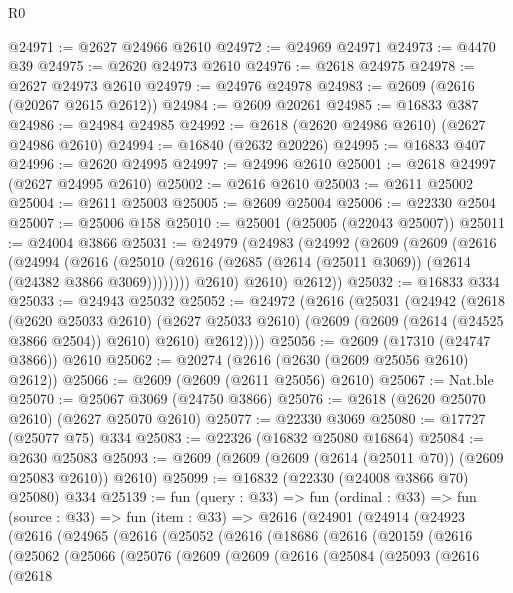 \begin{lexlean}{R0}
\begin{coremodule}
@24971 := @2627 @24966 @2610
@24972 := @24969 @24971
@24973 := @4470 @39
@24975 := @2620 @24973 @2610
@24976 := @2618 @24975
@24978 := @2627 @24973 @2610
@24979 := @24976 @24978
@24983 := @2609 (@2616 (@20267 @2615 @2612))
@24984 := @2609 @20261
@24985 := @16833 @387
@24986 := @24984 @24985
@24992 := @2618 (@2620 @24986 @2610) (@2627 @24986 @2610)
@24994 := @16840 (@2632 @20226)
@24995 := @16833 @407
@24996 := @2620 @24995
@24997 := @24996 @2610
@25001 := @2618 @24997 (@2627 @24995 @2610)
@25002 := @2616 @2610
@25003 := @2611 @25002
@25004 := @2611 @25003
@25005 := @2609 @25004
@25006 := @22330 @2504
@25007 := @25006 @158
@25010 := @25001 (@25005 (@22043 @25007))
@25011 := @24004 @3866
@25031 := @24979
    (@24983
      (@24992
        (@2609
          (@2609
            (@2616
              (@24994
                (@2616
                  (@25010 (@2616 (@2685 (@2614 (@25011 @3069)) (@2614 (@24382 @3866 @3069))))))))
            @2610)
          @2610)
        @2612))
@25032 := @16833 @334
@25033 := @24943 @25032
@25052 := @24972
    (@2616
      (@25031
        (@24942
          (@2618
            (@2620 @25033 @2610)
            (@2627 @25033 @2610)
            (@2609 (@2609 (@2614 (@24525 @3866 @2504)) @2610) @2610)
            @2612))))
@25056 := @2609 (@17310 (@24747 @3866)) @2610
@25062 := @20274 (@2616 (@2630 (@2609 @25056 @2610) @2612))
@25066 := @2609 (@2609 (@2611 @25056) @2610)
@25067 := Nat.ble
@25070 := @25067 @3069 (@24750 @3866)
@25076 := @2618 (@2620 @25070 @2610) (@2627 @25070 @2610)
@25077 := @22330 @3069
@25080 := @17727 (@25077 @75) @334
@25083 := @22326 (@16832 @25080 @16864)
@25084 := @2630 @25083
@25093 := @2609 (@2609 (@2609 (@2614 (@25011 @70)) (@2609 @25083 @2610)) @2610)
@25099 := @16832 (@22330 (@24008 @3866 @70) @25080) @334
@25139 := fun (query : @33) =>
  fun (ordinal : @33) =>
  fun (source : @33) =>
  fun (item : @33) =>
  @2616
    (@24901
      (@24914
        (@24923
          (@2616
            (@24965
              (@2616
                (@25052
                  (@2616
                    (@18686
                      (@2616
                        (@20159
                          (@2616
                            (@25062
                              (@25066
                                (@25076
                                  (@2609
                                    (@2609
                                      (@2616
                                        (@25084
                                          (@25093
                                            (@2616
                                              (@2618

\end{coremodule}
\end{lexlean}
